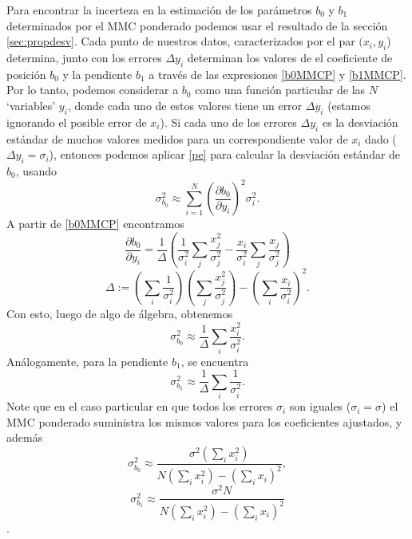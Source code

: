 \documentclass[letterpaper,11pt]{report}
\begin{document}
Para encontrar la incerteza en la estimación de los parámetros $b_0$ y $b_1$ determinados por el MMC ponderado podemos usar el resultado de la sección \ref{sec:propdesv}. Cada punto de nuestros datos, caracterizados por el par $(x_i,y_i$) determina, junto con los errores $\Delta y_i$ determinan los valores de el coeficiente de posición $b_0$ y la pendiente $b_1$ a través de las expresiones \ref{b0MMCP} y \ref{b1MMCP}. Por lo tanto, podemos considerar a $b_0$ como una función particular de las $N$ `variables' $y_i$, donde cada uno de estos valores tiene un error $\Delta y_i$ (estamos ignorando el posible error de $x_i$). Si cada uno de los errores $\Delta y_i$ es la desviación estándar de muchos valores medidos para un correspondiente valor de $x_i$ dado ($\Delta y_i=\sigma_i$), entonces podemos aplicar \ref{pe} para calcular la desviación estándar de $b_0$, usando
\begin{equation}
\sigma_{b_0}^2\approx\sum_{i=1}^N\left(\frac{\partial b_0}{\partial y_i}\right)^2\sigma_i^2.
\end{equation}
A partir de \ref{b0MMCP} encontramos
\begin{equation}
\frac{\partial b_0}{\partial y_i}=\frac{1}{\Delta}\left(\frac{1}{\sigma_i^2}\sum_j\frac{x_j^2}{\sigma_j^2}-\frac{x_i}{\sigma_i^2}\sum_j\frac{x_j}{\sigma_j^2}\right)
\end{equation}
\begin{equation}
\Delta:=\left(\sum_i\frac{1}{\sigma_i^2}\right)\left(\sum_j\frac{x_j^2}{\sigma_j^2}\right)-\left(\sum_i\frac{x_i}{\sigma_i^2}\right)^2.
\end{equation}
Con esto, luego de algo de álgebra, obtenemos
\begin{equation}
\sigma_{b_0}^2\approx \frac{1}{\Delta}\sum_i\frac{x_i^2}{\sigma_i^2}.
\end{equation}
Análogamente, para la pendiente $b_1$, se encuentra
\begin{equation}
\sigma_{b_1}^2\approx \frac{1}{\Delta}\sum_i\frac{1}{\sigma_i^2}.
\end{equation}
Note que en el caso particular en que todos los errores $\sigma_i$ son iguales ($\sigma_i=\sigma$) el MMC ponderado suministra los mismos valores para los coeficientes ajustados, y además
\begin{equation}
\sigma_{b_0}^2\approx \frac{\sigma^2\left(\sum_i x_i^2\right)}{N\left(\sum_i x_i^2\right)-\left(\sum_i x_i\right)^2},
\end{equation}
\begin{equation}
\sigma_{b_1}^2\approx \frac{\sigma^2N}{N\left(\sum_i x_i^2\right)-\left(\sum_i x_i\right)^2}
\end{equation}.
\end{document}
